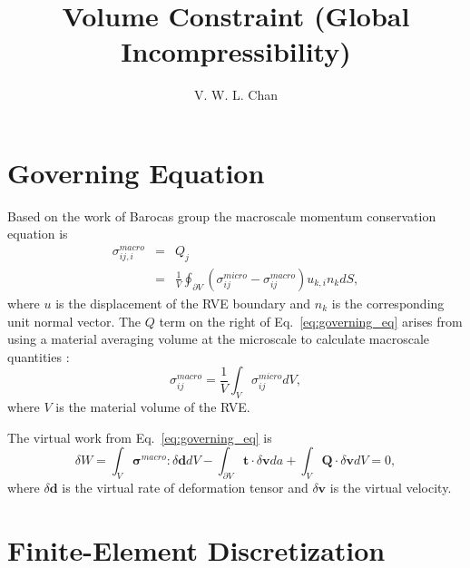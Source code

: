 \documentclass[12pt,aps,pre]{revtex4}
\begin{document}
\title{Volume Constraint (Global Incompressibility)}
\author{V. W. L. Chan}
\maketitle

\section{Governing Equation}

Based on the work of Barocas group \cite{Chandran:2007hy,Stylianopoulos:2007dp} the macroscale momentum conservation equation is
%
\begin{eqnarray}
\sigma^{macro}_{ij,i} &=& Q_j \nonumber\\
%
&=&\frac{1}{V} \oint_{\partial V} \left( \sigma^{micro}_{ij} - \sigma^{macro}_{ij} \right)u_{k,i}n_k dS,
\label{eq:governing_eq}
\end{eqnarray}
%
where $u$ is the displacement of the RVE boundary and $n_k$ is the corresponding unit normal vector. The $Q$ term on the right of Eq.\ \eqref{eq:governing_eq} arises from using a material averaging volume at the microscale to calculate macroscale quantities \cite{Chandran:2007hy}:
%
\begin{equation}
\sigma_{ij}^{macro} = \frac{1}{V}\int_{V}\sigma_{ij}^{micro} dV,
\end{equation}
%
where $V$ is the material volume of the RVE.

The virtual work from Eq.\ \eqref{eq:governing_eq} is \cite{JavierBonet:2008uxa}
%
\begin{equation}
\delta W = \int_V \pmb{\sigma}^{macro} : \delta\pmb{d} dV - \int_{\partial V} \pmb{t} \cdot \delta \pmb{v} da + \int_V \pmb{Q} \cdot \delta \pmb{v} dV = 0,
\label{eq:weak_form}
\end{equation}
%
where $\delta \pmb{d}$ is the virtual rate of deformation tensor and $\delta \pmb{v}$ is the virtual velocity.

\section{Finite-Element Discretization}
\end{document}
